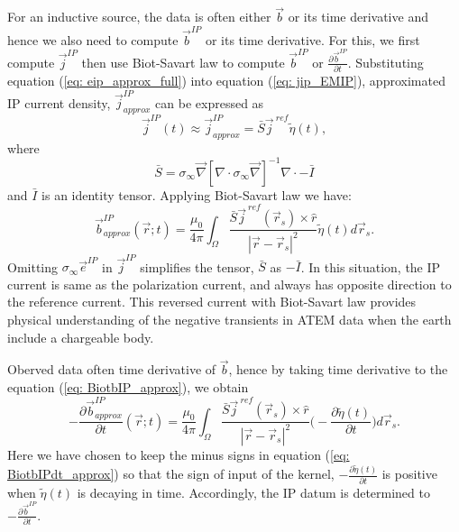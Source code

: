\documentclass[a4paper, 11pt]{article}
\renewcommand{\div}{\nabla\cdot}
\newcommand{\grad}{\vec \nabla}
\newcommand{\siginf}{\sigma_\infty}
\renewcommand {\j}  { {\vec j} }
\renewcommand {\b}  { {\vec b} }
\newcommand {\e}  { {\vec e} }
\newcommand{\peta}{\tilde{\eta}}
\newcommand{\jref}{\j^{\ ref}}
\begin{document}
For an inductive source, the data is often either $\b$ or its time derivative and hence we also need to compute $\b^{IP}$ or its time derivative.
For this, we first compute $\j^{IP}$ then use Biot-Savart law to compute $\b^{IP}$ or $\frac{\partial \b^{IP}}{\partial t}$. 
Substituting equation (\ref{eq: eip_approx_full}) into equation (\ref{eq: jip_EMIP}), approximated IP current density, $\j^{IP}_{approx}$ can be expressed as
\begin{equation}
  \j^{IP}(t) \approx \j^{IP}_{approx} = \bar{S}\jref\peta(t),
  \label{eq: jip_approx}
\end{equation}
where
\begin{equation}
  \bar{S} = \siginf\grad[\div \siginf\grad]^{-1}\div-\bar{I}
\end{equation}
and $\bar{I}$ is an identity tensor. 
Applying Biot-Savart law we have:
\begin{equation}
  \b^{IP}_{approx}(\vec{r}; t) = \frac{\mu_0}{4\pi}\int_{\Omega}  \frac{\bar{S}\j^{\ ref}(\vec{r}_s)\times\hat{r}}{|\vec{r}-\vec{r}_s|^2}\peta(t)d\vec{r}_s.
  \label{eq: BiotbIP_approx}
\end{equation}
Omitting $\siginf\e^{IP}$ in $\j^{IP}$ simplifies the tensor, $\bar{S}$ as $-\bar{I}$. 
In this situation, the IP current is same as the polarization current, and always has opposite direction to the reference current. 
This reversed current with Biot-Savart law provides physical understanding of the negative transients in ATEM data when the earth include a chargeable body. 

Oberved data often time derivative of $\b$, hence by taking time derivative to the equation (\ref{eq: BiotbIP_approx}), we obtain
\begin{equation}
  -\frac{\partial\b^{IP}_{approx}}{\partial t}(\vec{r}; t) = \frac{\mu_0}{4\pi} \int_{\Omega}  \frac{\bar{S}\jref(\vec{r}_s)\times\hat{r}}{|\vec{r}-\vec{r}_s|^2} \Big( -\frac{\partial \peta(t)}{\partial t} \Big) d\vec{r}_s.
  \label{eq: BiotbIPdt_approx}
\end{equation}
Here we have chosen to keep the minus signs in equation (\ref{eq: BiotbIPdt_approx}) so that the sign of input of the kernel, $-\frac{\partial \peta(t)}{\partial t}$ is positive when $\peta(t)$ is decaying in time. 
Accordingly, the IP datum is determined to $-\frac{\partial\b^{IP}}{\partial t}$. 
\end{document}
